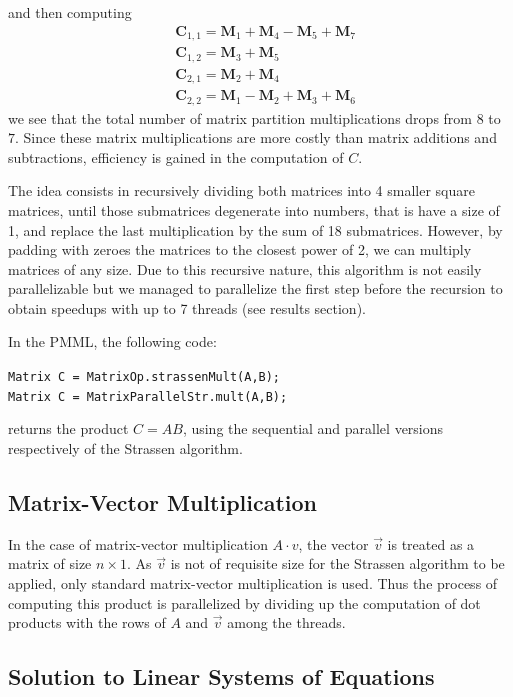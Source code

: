 \documentclass{dependencies/acm_proc_article-sp}
\begin{document}
and then computing 
\begin{align*}
&\mathbf{C}_{1,1} = \mathbf{M}_{1} + \mathbf{M}_{4} - \mathbf{M}_{5} + \mathbf{M}_{7}\\
&\mathbf{C}_{1,2} = \mathbf{M}_{3} + \mathbf{M}_{5}\\
&\mathbf{C}_{2,1} = \mathbf{M}_{2} + \mathbf{M}_{4}\\
&\mathbf{C}_{2,2} = \mathbf{M}_{1} - \mathbf{M}_{2} + \mathbf{M}_{3} + \mathbf{M}_{6}
\end{align*}
we see that the total number of matrix partition multiplications drops from $8$ to $7$. Since these matrix multiplications are more costly than matrix additions and subtractions, efficiency is gained in the computation of $C$.

The idea consists in recursively dividing both matrices into 4 smaller square matrices, until those submatrices degenerate into numbers, that is have a size of 1, and replace the last multiplication by the sum of 18 submatrices. However, by padding with zeroes the matrices to the closest power of 2, we can multiply matrices of any size. Due to this recursive nature, this algorithm is not easily parallelizable but we managed to parallelize the first step before the recursion to obtain speedups with up to 7 threads (see results section).

In the PMML, the following code:

{\tt Matrix C = MatrixOp.strassenMult(A,B);\\
Matrix C = MatrixParallelStr.mult(A,B);}

returns the product $C=AB$, using the sequential and parallel versions respectively of the Strassen algorithm. 

\subsection{Matrix-Vector Multiplication}

In the case of matrix-vector multiplication $A\cdot v$, the vector $\vec{v}$ is treated as a matrix of size $n\times 1$. As $\vec{v}$ is not of requisite size for the Strassen algorithm to be applied, only standard matrix-vector multiplication is used. Thus the process of computing this product is parallelized by dividing up the computation of dot products with the rows of $A$ and $\vec{v}$ among the threads.

\subsection{Solution to Linear Systems of Equations}
\end{document}
